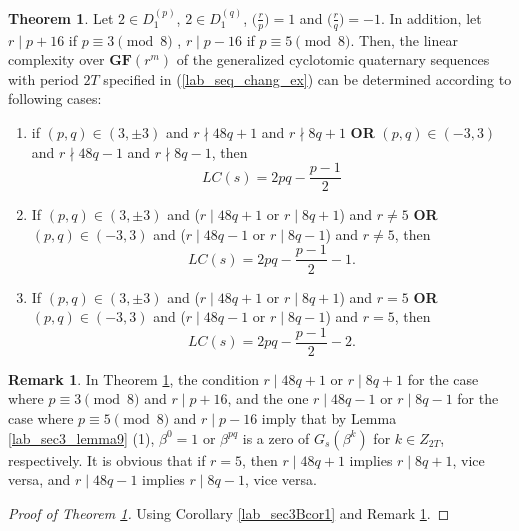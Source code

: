 \documentclass{mcom-l}
\theoremstyle{definition}
\newtheorem{sec3_B_remark4}[sec3_remark1]{Remark}
\newtheorem{sec3thm2x}[sec3thm1]{Theorem}
\numberwithin{equation}{section}
\begin{document}
     \begin{sec3thm2x}\label{lab_MainThorem_02x}
       Let $ 2\in D_{1}^{(p)} $, $ 2\in D_{1}^{(q)} $, $ \bigl(\tfrac{r}{p}\bigr) =1$ and $ \bigl(\tfrac{r}{q}\bigr) =-1$. In addition, let $ r\mid p+16 $ if $ p\equiv 3 \pmod 8 $ , $ r\mid p-16 $  if $ p\equiv 5 \pmod 8 $. Then, the linear complexity over $ \mathbf{GF}(r^{m}) $ of the generalized cyclotomic quaternary sequences with period $ 2T $ specified in (\ref{lab_seq_chang_ex}) can be determined according to following cases:
     \begin{enumerate} \item if $ (p,q)\in (3,\pm 3) $ and $ r\nmid 48q+1 $ and $ r\nmid 8q+1 $ \textbf{OR } $ (p,q)\in (-3,3) $  and $ r\nmid 48q-1 $ and $ r\nmid 8q-1 $, then 
     \begin{equation*}
     LC(s)=2pq-\dfrac{p-1}{2}
     \end{equation*}
\item If $ (p,q)\in (3,\pm 3) $ and ($ r\mid 48q+1 $ or $ r\mid 8q+1 $) and $ r\ne 5 $ \textbf{OR} $ (p,q)\in (-3,3) $ and ($ r\mid 48q-1 $ or $ r\mid 8q-1 $) and $ r\ne 5 $, then 
      \begin{equation*}
       LC(s)=2pq-\dfrac{p-1}{2}-1.
       \end{equation*}
\item If $ (p,q)\in (3,\pm 3) $ and ($ r\mid 48q+1 $ or $ r\mid 8q+1 $) and $ r=5 $ \textbf{OR} $ (p,q)\in (-3,3) $ and ($ r\mid 48q-1 $ or $ r\mid 8q-1 $) and $ r= 5 $, then 
         \begin{equation*}
         LC(s)=2pq-\dfrac{p-1}{2}-2.
           \end{equation*}
\end{enumerate}
       \end{sec3thm2x}
   \begin{sec3_B_remark4}\label{Lab_sec3_B_remark4}
   In Theorem \ref{lab_MainThorem_02x}, the condition $ r\mid 48q+1 $ or $ r\mid 8q+1 $ for the case where $ p\equiv 3\pmod 8 $ and $ r\mid p+16 $, and the one  $ r\mid 48q-1 $ or $ r\mid 8q-1 $ for the case where $ p\equiv 5\pmod 8 $ and $ r\mid p-16 $ imply that by Lemma \ref{lab_sec3_lemma9} (1), $ \beta^{0}=1 $ or $ \beta^{pq}$ is a zero of $ G_{s}(\beta^{k}) $ for $ k\in Z_{2T} $, respectively. It is obvious that if $ r=5 $, then $ r\mid 48q+1 $ implies $ r\mid 8q+1 $, vice versa, and $ r\mid 48q-1 $ implies $ r\mid 8q-1 $, vice versa.
   \end{sec3_B_remark4}
   \begin{proof}[Proof of Theorem \ref{lab_MainThorem_02x}]
     Using  Corollary \ref{lab_sec3Bcor1} and Remark \ref{Lab_sec3_B_remark4}.
   \end{proof}  
\end{document}
